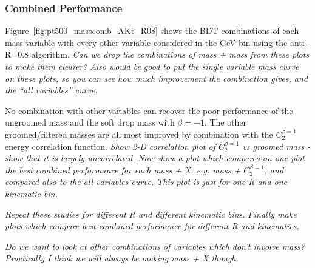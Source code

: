 \subsubsection{Combined Performance}

Figure~\ref{fig:pt500_masscomb_AKt_R08} shows the BDT combinations of each mass variable with every other
variable considered in the  GeV bin using the anti-\kT R=0.8
algorithm. {\it Can we drop the combinations of mass + mass
from these plots to make them clearer? Also would be good to put the
single variable mass curve on these plots, so you can see how much
improvement the combination gives, and the ``all variables'' curve.}

No combination with other variables can recover the poor performance
of the ungroomed mass and the soft drop mass with $\beta=-1$. The
other groomed/filtered masses are all most improved by combination
with the $C_{2}^{\beta=1}$ energy correlation function. {\it Show 2-D
correlation plot of $C_{2}^{\beta=1}$ vs groomed mass - show that it
is largely uncorrelated.}
{\it Now show a plot which compares on one plot the best combined performance for
each mass + X. e.g. mass + $C_{2}^{\beta=1}$, and compared also to the
all variables curve. This plot is just for
one R and one kinematic bin.}

{\it Repeat these studies for different R and different kinematic
bins. Finally make plots which compare best combined performance for
different R and kinematics.}

{\it Do we want to look at other combinations of variables which don't
involve mass? Practically I think we will always be making mass + X though.}


